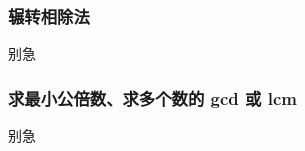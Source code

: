 \subsubsection{辗转相除法}
\begin{frame}[c]
  \progressnow
\end{frame}
\begin{frame}{别急}\end{frame} %
\subsubsection{求最小公倍数、求多个数的 gcd 或 lcm}
\begin{frame}[c]
  \progressnow
\end{frame}
\begin{frame}{别急}\end{frame} %

